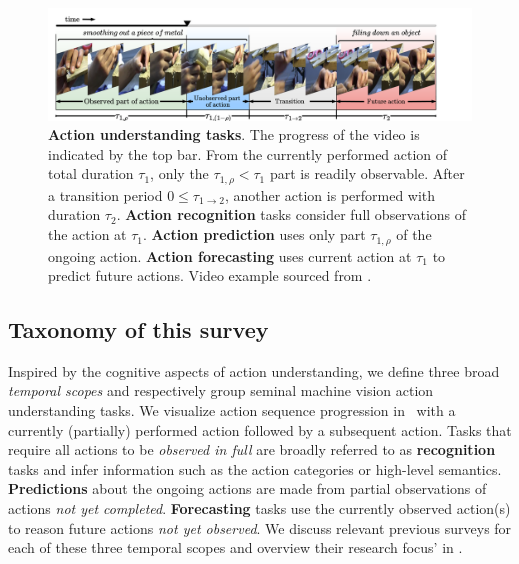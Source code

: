 \begin{figure}[t]
    \centering
    \includegraphics[width=\linewidth,trim={1cm 0 6cm 0},clip]{figs/action_understanding_tasks.pdf}
    \caption{\textbf{Action understanding tasks}. The progress of the video is indicated by the top bar. From the currently performed action of total duration $\tau_1$, only the $\tau_{1,\rho}<\tau_1 $ part is readily observable. After a transition period $0\leq\tau_{1 \rightarrow 2}$, another action is performed with duration $\tau_2$. \textbf{Action recognition} tasks consider full observations of the action at $\tau_1$. \textbf{Action prediction} uses only part $\tau_{1,\rho}$ of the ongoing action. \textbf{Action forecasting} uses current action at $\tau_1$ to predict future actions. Video example sourced from \citet{wang2019vatex}.} 
    \label{fig:tasks}
\end{figure}

\subsection{Taxonomy of this survey}

Inspired by the cognitive aspects of action understanding, we define three broad \emph{temporal scopes} and respectively group seminal machine vision action understanding tasks. We visualize action sequence progression in~ with a currently (partially) performed action followed by a subsequent action. Tasks that require all actions to be \emph{observed in full} are broadly referred to as \textbf{recognition} tasks and infer information such as the action categories or high-level semantics. \textbf{Predictions} about the ongoing actions are made from partial observations of actions \emph{not yet completed}. \textbf{Forecasting} tasks use the currently observed action(s) to reason future actions \emph{not yet observed}.  We discuss relevant previous surveys for each of these three temporal scopes and overview their research focus' in .

